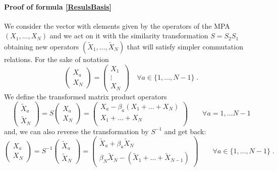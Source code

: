 \documentclass[10pt]{article}
\numberwithin{equation}{section}
\numberwithin{equation}{subsection}
\newcommand{\Xt}{\widetilde{X}}
\newcommand{\dt}{\;.}
\begin{document}
\paragraph{Proof of formula \eqref{ResulsBasis}} 
We consider the vector with elements given by the operators of the MPA $(X_{1},\ldots,X_{N})$ and we act on it with the similarity transformation $S=S_{2}S_{1}$ obtaining new operators $(\Xt_{1},\ldots,\Xt_{N})$ that will satisfy simpler commutation relations. 
For the sake of notation 
\begin{equation}
    \begin{pmatrix}
		X_{a}\\ 
		X_{N}
	\end{pmatrix}=\begin{pmatrix}
	    X_{1}\\
     \vdots\\
     X_{N}
	\end{pmatrix}\quad \forall a\in \{1,\ldots,N-1\}\dt
\end{equation}
We define the transformed matrix product operators
\begin{equation}\label{Xtildes2b}
	\begin{pmatrix}
		\Xt_{a}\\ 
		\Xt_{N}
	\end{pmatrix} =S\begin{pmatrix}
		X_{a}\\X_{N}
	\end{pmatrix}=\begin{pmatrix} 
		X_{a}-\beta_{a}(X_{1}+\ldots+X_{N})\\
				X_{1}+\ldots +X_{N}\\
	\end{pmatrix}%
	\qquad \forall a=1,\ldots N-1
\end{equation}
and, we can also reverse the transformation by $S^{-1}$ and get back: 
\begin{equation}\label{Xes}
	\begin{pmatrix}
		X_{a}\\
		X_{N} 
	\end{pmatrix} =S^{-1}\begin{pmatrix}
		\widetilde{X}_{a}\\
		\widetilde{X}_{N}
	\end{pmatrix}=\begin{pmatrix}
		\Xt_{a}+\beta_{a}\Xt_{N}\\ 
		\beta_N\Xt_{N}-(\Xt_{1}+\ldots+\Xt_{N-1})
	\end{pmatrix}\qquad\forall a\in \{1,\ldots,N-1\}\dt
\end{equation}
\end{document}
